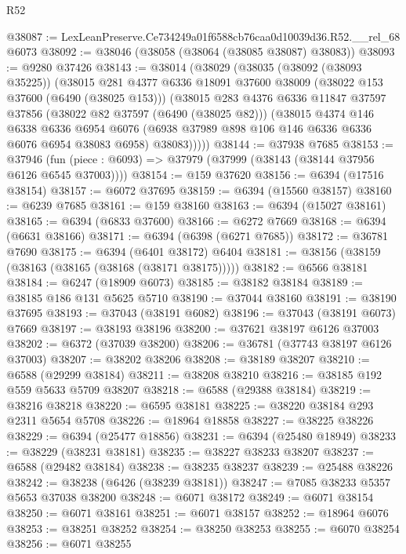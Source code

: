 \begin{lexlean}{R52}
\begin{coremodule}
@38087 := LexLeanPreserve.Ce734249a01f6588cb76caa0d10039d36.R52.__rel_68 @6073
@38092 := @38046 (@38058 (@38064 (@38085 @38087) @38083))
@38093 := @9280 @37426
@38143 := @38014
    (@38029
      (@38035
        (@38092 (@38093 @35225))
        (@38015
          @281
          @4377
          @6336
          @18091
          @37600
          @38009
          (@38022 @153 @37600 (@6490 (@38025 @153)))
          (@38015
            @283
            @4376
            @6336
            @11847
            @37597
            @37856
            (@38022 @82 @37597 (@6490 (@38025 @82)))
            (@38015
              @4374
              @146
              @6338
              @6336
              @6954
              @6076
              (@6938 @37989 @898 @106 @146 @6336 @6336 @6076 @6954 @38083 @6958)
              @38083)))))
@38144 := @37938 @7685
@38153 := @37946
    (fun (piece : @6093) => @37979 (@37999 (@38143 (@38144 @37956 @6126 @6545 @37003))))
@38154 := @159 @37620
@38156 := @6394 (@17516 @38154)
@38157 := @6072 @37695
@38159 := @6394 (@15560 @38157)
@38160 := @6239 @7685
@38161 := @159 @38160
@38163 := @6394 (@15027 @38161)
@38165 := @6394 (@6833 @37600)
@38166 := @6272 @7669
@38168 := @6394 (@6631 @38166)
@38171 := @6394 (@6398 (@6271 @7685))
@38172 := @36781 @7690
@38175 := @6394 (@6401 @38172) @6404
@38181 := @38156 (@38159 (@38163 (@38165 (@38168 (@38171 @38175)))))
@38182 := @6566 @38181
@38184 := @6247 (@18909 @6073)
@38185 := @38182 @38184
@38189 := @38185 @186 @131 @5625 @5710
@38190 := @37044 @38160
@38191 := @38190 @37695
@38193 := @37043 (@38191 @6082)
@38196 := @37043 (@38191 @6073) @7669
@38197 := @38193 @38196
@38200 := @37621 @38197 @6126 @37003
@38202 := @6372 (@37039 @38200)
@38206 := @36781 (@37743 @38197 @6126 @37003)
@38207 := @38202 @38206
@38208 := @38189 @38207
@38210 := @6588 (@29299 @38184)
@38211 := @38208 @38210
@38216 := @38185 @192 @559 @5633 @5709 @38207
@38218 := @6588 (@29388 @38184)
@38219 := @38216 @38218
@38220 := @6595 @38181
@38225 := @38220 @38184 @293 @2311 @5654 @5708
@38226 := @18964 @18858
@38227 := @38225 @38226
@38229 := @6394 (@25477 @18856)
@38231 := @6394 (@25480 @18949)
@38233 := @38229 (@38231 @38181)
@38235 := @38227 @38233 @38207
@38237 := @6588 (@29482 @38184)
@38238 := @38235 @38237
@38239 := @25488 @38226
@38242 := @38238 (@6426 (@38239 @38181))
@38247 := @7085 @38233 @5357 @5653 @37038 @38200
@38248 := @6071 @38172
@38249 := @6071 @38154
@38250 := @6071 @38161
@38251 := @6071 @38157
@38252 := @18964 @6076
@38253 := @38251 @38252
@38254 := @38250 @38253
@38255 := @6070 @38254
@38256 := @6071 @38255

\end{coremodule}
\end{lexlean}
